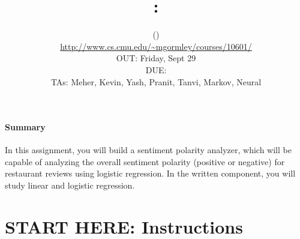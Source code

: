 \documentclass[11pt,addpoints,answers]{exam}
\title{\textsc{\hwNum}: \textsc{\hwTopic}
} %
\author{\courseNum \courseName (\courseSem)\\
\url{http://www.cs.cmu.edu/~mgormley/courses/10601/} \\
OUT: Friday, Sept 29 \\
DUE: \dueDate{} \\
TAs: Meher, Kevin, Yash, Pranit, Tanvi, Markov, Neural
}
\date{}
\date{}
\begin{document}
\maketitle

\begin{notebox}
\paragraph{Summary} In this assignment, you will build a sentiment polarity analyzer, which will be capable of analyzing the overall sentiment polarity (positive or negative) for restaurant reviews using logistic regression. In the written component, you will study linear and logistic regression.
\end{notebox}\section*{START HERE: Instructions}
\end{document}
